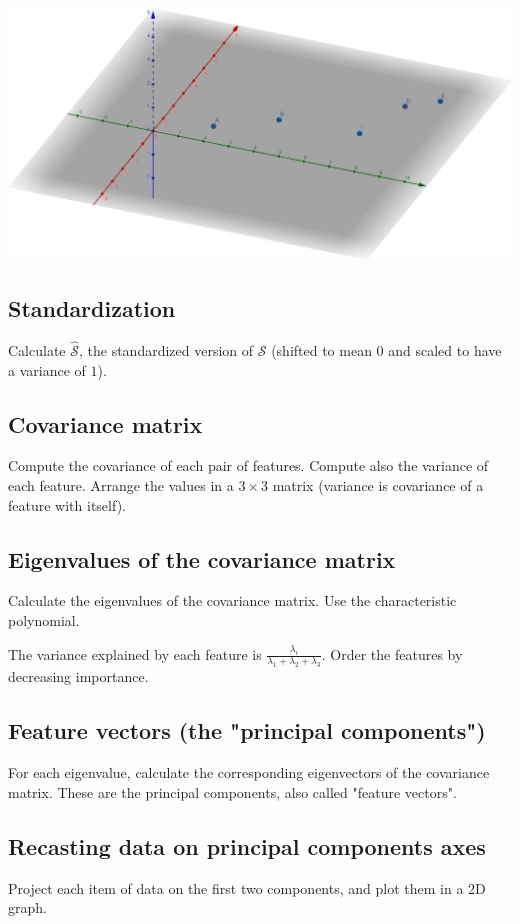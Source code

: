 \documentclass[]{article}
\begin{document}
	\begin{center}
		\vspace{0.2cm}
		\includegraphics[width=0.95\linewidth]{points}
		\vspace{0.2cm}
	\end{center}
	
	\subsection{Standardization}
	Calculate $\hat{\mathcal{S}}$, the standardized version of $\mathcal{S}$ (shifted to mean $0$ and scaled to have a variance of $1$).
	
	\subsection{Covariance matrix}
	Compute the covariance of each pair of features.
	Compute also the variance of each feature.
	Arrange the values in a $3 \times 3$ matrix (variance is covariance of a feature with itself).
	
	\subsection{Eigenvalues of the covariance matrix}
	Calculate the eigenvalues of the covariance matrix.
	Use the characteristic polynomial.
	
	The variance explained by each feature is $\frac{\lambda_i}{\lambda_1+\lambda_2+\lambda_3}$.
	Order the features by decreasing importance.
	
	\subsection{Feature vectors (the "principal components")}
	For each eigenvalue, calculate the corresponding eigenvectors of the covariance matrix.
	These are the principal components, also called "feature vectors".
	
	\subsection{Recasting data on principal components axes}
	Project each item of data on the first two components, and plot them in a 2D graph.
\end{document}
